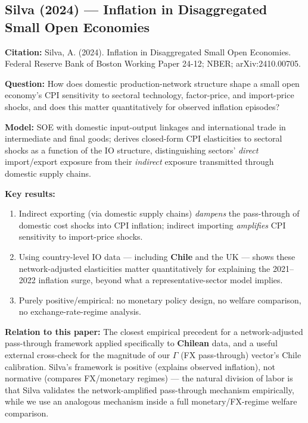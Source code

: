 \documentclass[12pt]{article}
\begin{document}
\subsection{Silva (2024) --- Inflation in Disaggregated Small Open Economies}
\label{lit:silva}

\textbf{Citation:} Silva, A. (2024). Inflation in Disaggregated Small Open Economies. Federal Reserve Bank of Boston Working Paper 24-12; NBER; arXiv:2410.00705.

\textbf{Question:} How does domestic production-network structure shape a small open economy's CPI sensitivity to sectoral technology, factor-price, and import-price shocks, and does this matter quantitatively for observed inflation episodes?

\textbf{Model:} SOE with domestic input-output linkages and international trade in intermediate and final goods; derives closed-form CPI elasticities to sectoral shocks as a function of the IO structure, distinguishing sectors' \emph{direct} import/export exposure from their \emph{indirect} exposure transmitted through domestic supply chains.

\textbf{Key results:}
\begin{enumerate}
    \item Indirect exporting (via domestic supply chains) \emph{dampens} the pass-through of domestic cost shocks into CPI inflation; indirect importing \emph{amplifies} CPI sensitivity to import-price shocks.
    \item Using country-level IO data --- including \textbf{Chile} and the UK --- shows these network-adjusted elasticities matter quantitatively for explaining the 2021--2022 inflation surge, beyond what a representative-sector model implies.
    \item Purely positive/empirical: no monetary policy design, no welfare comparison, no exchange-rate-regime analysis.
\end{enumerate}

\textbf{Relation to this paper:} The closest empirical precedent for a network-adjusted pass-through framework applied specifically to \textbf{Chilean} data, and a useful external cross-check for the magnitude of our $\Gamma$ (FX pass-through) vector's Chile calibration. Silva's framework is positive (explains observed inflation), not normative (compares FX/monetary regimes) --- the natural division of labor is that Silva validates the network-amplified pass-through mechanism empirically, while we use an analogous mechanism inside a full monetary/FX-regime welfare comparison.
\end{document}
